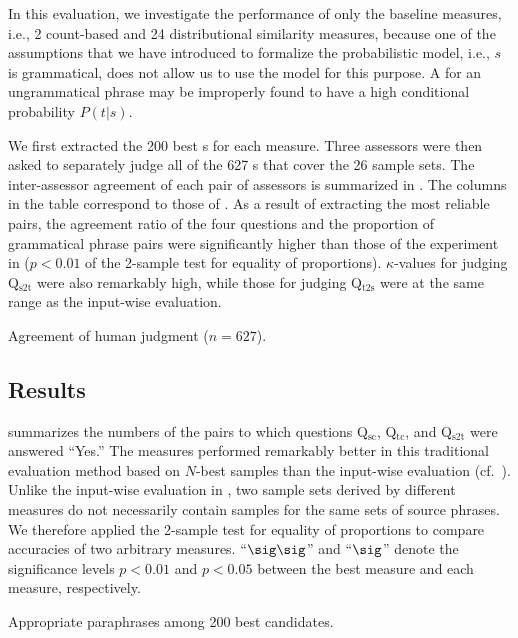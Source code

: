 \documentclass[english]{jnlp_1.4}
\begin{document}
In this evaluation, we investigate the performance of only the
baseline measures, i.e., 2 count-based and 24 distributional
similarity measures, because one of the assumptions that we have
introduced to formalize the probabilistic model, i.e., $s$ is
grammatical, does not allow us to use the model for this purpose.
A {\pc} for an ungrammatical phrase may be improperly found to have a
high conditional probability $P(t|s)$.

We first extracted the 200 best {\pcp}s for each measure.  Three
assessors were then asked to separately judge all of the 627 {\pcp}s
that cover the 26 sample sets.
The inter-assessor agreement of each pair of assessors is summarized
in .  The columns in the table correspond to those of
.  As a result of extracting the most reliable pairs,
the agreement ratio of the four questions and the proportion of
grammatical phrase pairs were significantly higher than those of the
experiment in  ($p<\text{0.01}$ of the 2-sample test for
equality of proportions).
$\kappa$-values for judging Q$_{\textrm{s2t}}$ were also remarkably
high, while those for judging Q$_{\textrm{t2s}}$ were at the same
range as the input-wise evaluation.

\begin{table}[t]
\caption{Agreement of human judgment ($n=\text{627}$).}
\label{tab:rec-judge}

\end{table}

\subsection{Results}
\label{ssec:ev-rec}

 summarizes the numbers of the {\pc} pairs to which
questions Q$_{\text{sc}}$, Q$_{\text{tc}}$, and Q$_{\text{s2t}}$ were
answered ``Yes.''
The measures performed remarkably better in this traditional
evaluation method based on $N$-best samples than the input-wise
evaluation (cf.~).
Unlike the input-wise evaluation in , two sample sets
derived by different measures do not necessarily contain samples for
the same sets of source phrases.  We therefore applied the 2-sample
test for equality of proportions to compare accuracies of two
arbitrary measures.
``$\sig\sig$'' and ``$\sig$'' denote the significance levels
$p<\text{0.01}$ and $p<\text{0.05}$ between the best measure and each
measure, respectively.

\begin{table}[t]
\caption{Appropriate paraphrases among 200 best candidates.}
\label{tab:rec-baseline}

\end{table}
\end{document}

